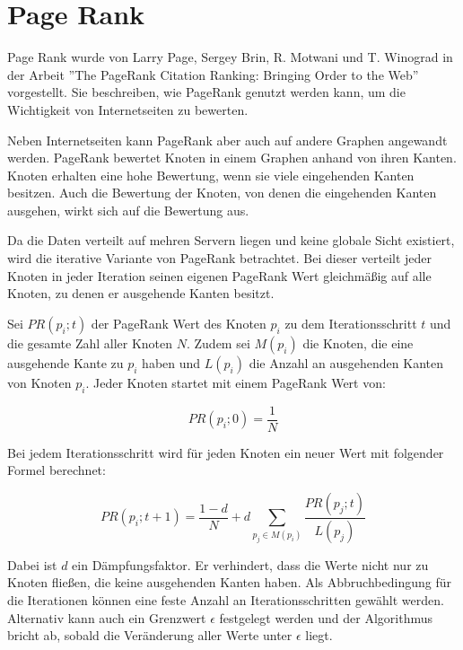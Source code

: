 \section{Page Rank}
\label{pageRank}

Page Rank wurde von Larry Page, Sergey Brin, R. Motwani und T. Winograd in der Arbeit ''The PageRank Citation Ranking:
Bringing Order to the Web''\cite{Page98thepagerank} vorgestellt. Sie beschreiben, wie PageRank genutzt werden kann, um die Wichtigkeit von Internetseiten zu bewerten.

Neben Internetseiten kann PageRank aber auch auf andere Graphen angewandt werden.
PageRank bewertet Knoten in einem Graphen anhand von ihren Kanten. Knoten erhalten eine hohe Bewertung, wenn sie viele eingehenden Kanten besitzen. Auch die Bewertung der Knoten, von denen die eingehenden Kanten ausgehen, wirkt sich auf die Bewertung aus.

Da die Daten verteilt auf mehren Servern liegen und keine globale Sicht existiert, wird die iterative Variante von PageRank betrachtet.
Bei dieser verteilt jeder Knoten in jeder Iteration seinen eigenen PageRank Wert gleichmäßig auf alle Knoten, zu denen er ausgehende Kanten besitzt. 


Sei $ PR(p_{i}; t)$ der PageRank Wert des Knoten $p_{i}$ zu dem Iterationsschritt $t$ und die gesamte Zahl aller Knoten $N$.
Zudem sei $M(p_{i})$ die Knoten, die eine ausgehende Kante zu $p_{i}$ haben und $L(p_{i})$ die Anzahl an ausgehenden Kanten von Knoten $p_{i}$.
Jeder Knoten startet mit einem PageRank Wert von:

\[  PR(p_{i}; 0) = \frac{1}{N}   \]

Bei jedem Iterationsschritt wird für jeden Knoten ein neuer Wert mit folgender Formel berechnet:

\[ PR(p_{i}; t+1) = \frac{1 - d}{N} + d \sum_{p_{j} \in M(p_{i})} \frac{PR(p_{j}; t)}{L(p_{j})} \]


Dabei ist $d$ ein Dämpfungsfaktor. Er verhindert, dass die Werte nicht nur zu Knoten fließen, die keine ausgehenden Kanten haben.
Als Abbruchbedingung für die Iterationen können eine feste Anzahl an Iterationsschritten gewählt werden. Alternativ kann auch ein Grenzwert $\epsilon$ festgelegt werden und der Algorithmus bricht ab, sobald die Veränderung aller Werte unter $\epsilon$ liegt.
